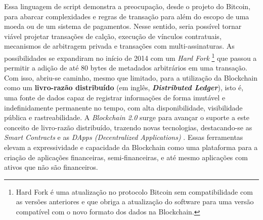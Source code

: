\documentclass[a4paper,11pt]{article}
\begin{document}
Essa linguagem de script demonstra a preocupação, desde o projeto do Bitcoin, para abarcar complexidades e regras de transação para além do escopo de uma moeda ou de um sistema de pagamentos. Nesse sentido, seria possível tornar viável projetar transações de calção, execução de vínculos contratuais, mecanismos de arbitragem privada e transações com multi-assinaturas.
As possibilidades se expandiram no início de 2014 \cite{Greenspan2015} com um \emph{Hard Fork}
\footnote{Hard Fork é uma atualização no protocolo Bitcoin sem compatibilidade com as versões anteriores e que obriga a atualização do software para uma versão compatível com o novo formato dos dados na Blockchain.}
que passou a permitir a adição de até 80 bytes de metadados arbitrários em uma transação. Com isso, abriu-se caminho, mesmo que limitado, para a utilização da Blockchain como um \textbf{livro-razão distribuído} (em inglês, \textbf{\textit{Distributed Ledger}}), isto é, uma fonte de dados capaz de registrar informações de forma imutável e indefinidamente permanente no tempo, com alta disponibilidade, visibilidade pública e rastreabilidade.
A \emph{Blockchain 2.0} surge para avançar o suporte a este conceito de livro-razão distribuído, trazendo novas tecnologias, destacando-se as \emph{Smart Contracts} e as \emph{DApps (Decentralized Applications)} \cite{Swan2015}.
Essas ferramentas elevam a expressividade e capacidade da Blockchain como uma plataforma para a criação de aplicações financeiras, semi-financeiras, e até mesmo aplicações com ativos que não são financeiros.



%  
\end{document}
